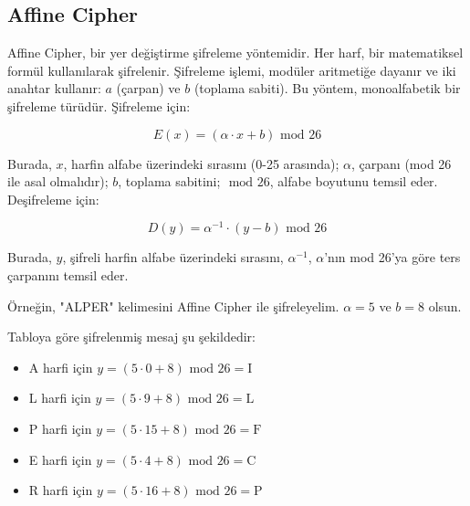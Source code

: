 \newpage

\subsection{Affine Cipher}

Affine Cipher, bir yer değiştirme şifreleme yöntemidir. Her harf, bir matematiksel formül kullanılarak şifrelenir. Şifreleme işlemi, modüler aritmetiğe dayanır ve iki anahtar kullanır: $a$ (çarpan) ve $b$ (toplama sabiti). Bu yöntem, monoalfabetik bir şifreleme türüdür. Şifreleme için:

\[ E(x) = (\alpha \cdot x + b) \text{ mod } 26 \]

Burada, $x$, harfin alfabe üzerindeki sırasını (0-25 arasında); $\alpha$, çarpanı (mod 26 ile asal olmalıdır); $b$, toplama sabitini; $\text{ mod } 26$, alfabe boyutunu temsil eder. Deşifreleme için:

\[ D(y) = \alpha^{-1} \cdot (y - b) \text{ mod } 26 \]

Burada, $y$, şifreli harfin alfabe üzerindeki sırasını, $\alpha^{-1}$, $\alpha$'nın mod 26'ya göre ters çarpanını temsil eder.

Örneğin, "ALPER" kelimesini Affine Cipher ile şifreleyelim. $\alpha = 5$ ve $b = 8$ olsun.

\begin{table}[ht]
\centering
{}
\end{table}

Tabloya göre şifrelenmiş mesaj şu şekildedir:

\begin{itemize}
    \item A harfi için $y = (5 \cdot 0 + 8) \text{ mod } 26 = \text{I}$
    \item L harfi için $y = (5 \cdot 9 + 8) \text{ mod } 26 = \text{L}$
    \item P harfi için $y = (5 \cdot 15 + 8) \text{ mod } 26 = \text{F}$
    \item E harfi için $y = (5 \cdot 4 + 8) \text{ mod } 26 = \text{C}$
    \item R harfi için $y = (5 \cdot 16 + 8) \text{ mod } 26 = \text{P}$
\end{itemize}

